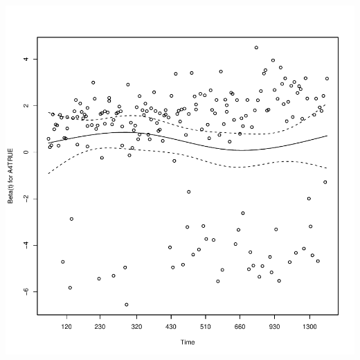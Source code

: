 \documentclass{article}\usepackage[]{graphicx}\usepackage[]{color}
\makeatletter
\def\maxwidth{ %
  \ifdim\Gin@nat@width>\linewidth
    \linewidth
  \else
    \Gin@nat@width
  \fi
}
\newenvironment{knitrout}{}{} %
\makeatother
\begin{document}
\begin{knitrout}
{}




{\centering \includegraphics[width=\maxwidth]{figure/eda-ph-check-full-8} 

}



\end{knitrout}
\end{document}
